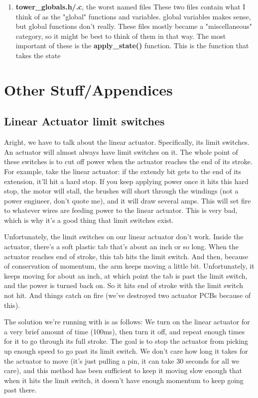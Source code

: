 \documentclass[11pt]{article}
\begin{document}
\begin{enumerate}
\item \textbf{tower\_globals.h/.c}, the worst named files
\label{sec:orgda69674}
These two files contain what I think of as the "global" functions and
variables. global variables makes sense, but global functions don't
really. These files mostly became a "miscellaneous" category, so it might be
best to think of them in that way. The most important of these is the
\textbf{apply\_state()} function. This is the function that takes the state
\end{enumerate}

\section{Other Stuff/Appendices}
\label{sec:org58ad61e}

\subsection{Linear Actuator limit switches}
\label{sec:org47aef76}
\label{sec:linear_act_lsw}

Aright, we have to talk about the linear actuator. Specifically, its limit
switches. An actuator will almost always have limit switches on it. The
whole point of these switches is to cut off power when the actuator reaches
the end of its stroke. For example, take the linear actuator: if the
extendy bit gets to the end of its extension, it'll hit a hard stop. If you
keep applying power once it hits this hard stop, the motor will stall, the
brushes will short through the windings (not a power engineer, don't quote
me), and it will draw several amps. This will set fire to whatever wires
are feeding power to the linear actuator. This is very bad, which is why
it's a good thing that limit switches exist.

Unfortunately, the limit switches on our linear actuator don't
work. Inside the actuator, there's a soft plastic tab that's about an inch
or so long. When the actuator reaches end of stroke, this tab hits the
limit switch. And then, because of conservation of momentum, the arm keeps
moving a little bit. Unfortunately, it keeps moving for about an inch, at
which point the tab is past the limit switch, and the power is turned back
on. So it hits end of stroke with the limit switch not hit. And things
catch on fire (we've destroyed two actuator PCBs because of this).

The solution we're running with is as follows: We turn on the linear
actuator for a very brief amount of time (100ms), then turn it off, and
repeat enough times for it to go through its full stroke. The goal is to
stop the actuator from picking up enough speed to go past its limit
switch. We don't care how long it takes for the actuator to move (it's just
pulling a pin, it can take 30 seconds for all we care), and this method has
been sufficient to keep it moving slow enough that when it hits the limit
switch, it doesn't have enough momentum to keep going past there.
\end{document}
